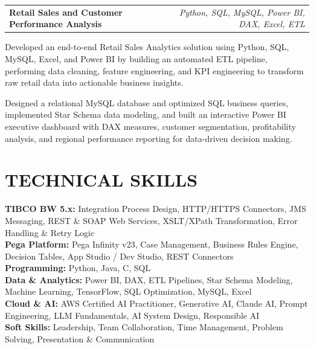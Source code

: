 \documentclass[10pt]{article}
\makeatletter
\newcommand{\entryrow}[3]{%
  \noindent\begin{tabularx}{\dimexpr\linewidth}{@{}X r@{}}
    \textbf{#1} & {\fontsize{9}{10.5}\selectfont\itshape\color{graytext}#2}\\
  \end{tabularx}%
  #3
}
\makeatother
\begin{document}
\entryrow{Retail Sales and Customer Performance Analysis}{Python, SQL, MySQL, Power BI, DAX, Excel, ETL}{}
\begin{tightitemize}
\item Developed an end-to-end Retail Sales Analytics solution using Python, SQL, MySQL, Excel, and Power BI by building an automated ETL pipeline, performing data cleaning, feature engineering, and KPI engineering to transform raw retail data into actionable business insights.
\item Designed a relational MySQL database and optimized SQL business queries, implemented Star Schema data modeling, and built an interactive Power BI executive dashboard with DAX measures, customer segmentation, profitability analysis, and regional performance reporting for data-driven decision making.
\end{tightitemize}

\section{TECHNICAL SKILLS}
\textbf{TIBCO BW 5.x:} Integration Process Design, HTTP/HTTPS Connectors, JMS Messaging, REST \& SOAP Web Services, XSLT/XPath Transformation, Error Handling \& Retry Logic\\[2pt]
\textbf{Pega Platform:} Pega Infinity v23, Case Management, Business Rules Engine, Decision Tables, App Studio / Dev Studio, REST Connectors\\[2pt]
\textbf{Programming:} Python, Java, C, SQL\\[2pt]
\textbf{Data \& Analytics:} Power BI, DAX, ETL Pipelines, Star Schema Modeling, Machine Learning, TensorFlow, SQL Optimization, MySQL, Excel\\[2pt]
\textbf{Cloud \& AI:} AWS Certified AI Practitioner, Generative AI, Claude AI, Prompt Engineering, LLM Fundamentals, AI System Design, Responsible AI\\[2pt]
\textbf{Soft Skills:} Leadership, Team Collaboration, Time Management, Problem Solving, Presentation \& Communication

\end{document}
